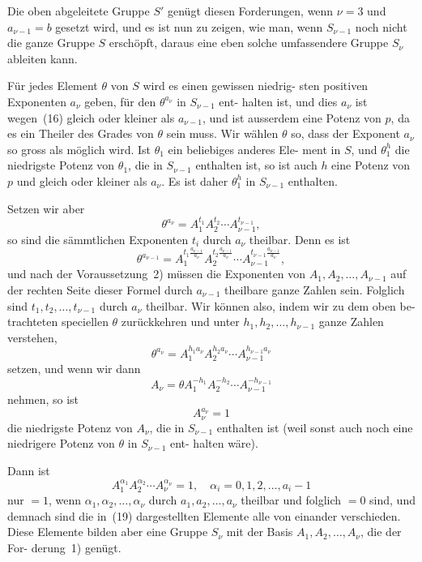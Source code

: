 \documentclass[12pt,a4paper]{article}
\theoremstyle{plain}
\theoremstyle{definition}
\theoremstyle{remark}
\begin{document}
Die oben abgeleitete Gruppe $S'$ genügt diesen Forderungen,
wenn $\nu = 3$ und $a_{\nu-1} = b$ gesetzt wird, und es ist nun zu zeigen,
wie man, wenn $S_{\nu-1}$ noch nicht die ganze Gruppe $S$ erschöpft,
daraus eine eben solche umfassendere Gruppe $S_\nu$ ableiten kann.

Für jedes Element $\theta$ von $S$ wird es einen gewissen niedrig-
sten positiven Exponenten $a_\nu$ geben, für den $\theta^{a_\nu}$ in $S_{\nu-1}$ ent-
halten ist, und dies $a_\nu$ ist wegen~(16) gleich oder kleiner als $a_{\nu-1}$,
und ist ausserdem eine Potenz von $p$, da es ein Theiler des
Grades von $\theta$ sein muss. Wir wählen $\theta$ so, dass der Exponent
$a_\nu$ so gross als möglich wird. Ist $\theta_1$ ein beliebiges anderes Ele-
ment in $S$, und $\theta_1^h$ die niedrigste Potenz von $\theta_1$, die in $S_{\nu-1}$
enthalten ist, so ist auch $h$ eine Potenz von $p$ und gleich oder
kleiner als $a_\nu$. Es ist daher $\theta_1^h$ in $S_{\nu-1}$ enthalten.

Setzen wir aber
\begin{equation}\tag{17}
\theta^{a_\nu} = A_1^{t_1} A_2^{t_2} \cdots A_{\nu-1}^{t_{\nu-1}},
\end{equation}
so sind die sämmtlichen Exponenten $t_i$ durch $a_\nu$ theilbar. Denn
es ist
\[
\theta^{a_{\nu-1}} = A_1^{t_1 \frac{a_{\nu-1}}{a_\nu}} A_2^{t_2 \frac{a_{\nu-1}}{a_\nu}} \cdots A_{\nu-1}^{t_{\nu-1} \frac{a_{\nu-1}}{a_\nu}},
\]
und nach der Voraussetzung~2) müssen die Exponenten von
$A_1, A_2, \ldots, A_{\nu-1}$ auf der rechten Seite dieser Formel durch $a_{\nu-1}$
theilbare ganze Zahlen sein. Folglich sind $t_1, t_2, \ldots, t_{\nu-1}$ durch
$a_\nu$ theilbar. Wir können also, indem wir zu dem oben be-
trachteten speciellen $\theta$ zurückkehren und unter $h_1, h_2, \ldots, h_{\nu-1}$
ganze Zahlen verstehen,
\[
\theta^{a_\nu} = A_1^{h_1 a_\nu} A_2^{h_2 a_\nu} \cdots A_{\nu-1}^{h_{\nu-1} a_\nu}
\]
setzen, und wenn wir dann
\[
A_\nu = \theta A_1^{-h_1} A_2^{-h_2} \cdots A_{\nu-1}^{-h_{\nu-1}}
\]
nehmen, so ist
\begin{equation}\tag{18}
A_\nu^{a_\nu} = 1
\end{equation}
die niedrigste Potenz von $A_\nu$, die in $S_{\nu-1}$ enthalten ist (weil
sonst auch noch eine niedrigere Potenz von $\theta$ in $S_{\nu-1}$ ent-
halten wäre).

Dann ist
\begin{equation}\tag{19}
A_1^{\alpha_1} A_2^{\alpha_2} \cdots A_\nu^{\alpha_\nu} = 1, \quad \alpha_i = 0, 1, 2, \ldots, a_i - 1
\end{equation}
nur $= 1$, wenn $\alpha_1, \alpha_2, \ldots, \alpha_\nu$ durch $a_1, a_2, \ldots, a_\nu$ theilbar und
folglich $= 0$ sind, und demnach sind die in~(19) dargestellten
Elemente alle von einander verschieden. Diese Elemente bilden
aber eine Gruppe $S_\nu$ mit der Basis $A_1, A_2, \ldots, A_\nu$, die der For-
derung~1) genügt.
\end{document}
